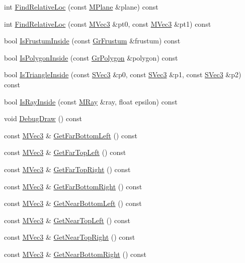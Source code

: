 \begin{CompactItemize}
\begin{CompactItemize}
int \hyperlink{class_gr_frustum_fa16710ead0525507d2f259836fd1c2c}{FindRelativeLoc} (const \hyperlink{class_m_plane}{MPlane} \&plane) const 
\item 
int \hyperlink{class_gr_frustum_c1d108b681015b4c01a7327302a86b6e}{FindRelativeLoc} (const \hyperlink{class_m_vec3}{MVec3} \&pt0, const \hyperlink{class_m_vec3}{MVec3} \&pt1) const 
\item 
bool \hyperlink{class_gr_frustum_40a44d1754e21de45629e9eb5b733cbc}{IsFrustumInside} (const \hyperlink{class_gr_frustum}{GrFrustum} \&frustum) const 
\item 
bool \hyperlink{class_gr_frustum_b48fd10eabe661c8d28e6ea55f143da5}{IsPolygonInside} (const \hyperlink{class_gr_polygon}{GrPolygon} \&polygon) const 
\item 
bool \hyperlink{class_gr_frustum_7bb6796010fb5e76de8f47850e0621da}{IsTriangleInside} (const \hyperlink{struct_s_vec3}{SVec3} \&p0, const \hyperlink{struct_s_vec3}{SVec3} \&p1, const \hyperlink{struct_s_vec3}{SVec3} \&p2) const 
\item 
bool \hyperlink{class_gr_frustum_1b77aec57f30ea71c3f583f2724166b8}{IsRayInside} (const \hyperlink{class_m_ray}{MRay} \&ray, float epsilon) const 
\item 
void \hyperlink{class_gr_frustum_daebcc27d64029d4749d2f3f08b373ac}{DebugDraw} () const 
\item 
const \hyperlink{class_m_vec3}{MVec3} \& \hyperlink{class_gr_frustum_397c8f3652cf399e6fd086fcf4e679fd}{GetFarBottomLeft} () const 
\item 
const \hyperlink{class_m_vec3}{MVec3} \& \hyperlink{class_gr_frustum_5cf3f35a1eddcde0f8f5386ed40c641f}{GetFarTopLeft} () const 
\item 
const \hyperlink{class_m_vec3}{MVec3} \& \hyperlink{class_gr_frustum_6501233fcb7db5d06b3ec22befa4fbdb}{GetFarTopRight} () const 
\item 
const \hyperlink{class_m_vec3}{MVec3} \& \hyperlink{class_gr_frustum_5aab839f4efc785026daf9c7c53284a0}{GetFarBottomRight} () const 
\item 
const \hyperlink{class_m_vec3}{MVec3} \& \hyperlink{class_gr_frustum_6c22fff9cd8287371cdf66a087d04ce9}{GetNearBottomLeft} () const 
\item 
const \hyperlink{class_m_vec3}{MVec3} \& \hyperlink{class_gr_frustum_5fc3092ebbcba98ef8d5e0c727d529e4}{GetNearTopLeft} () const 
\item 
const \hyperlink{class_m_vec3}{MVec3} \& \hyperlink{class_gr_frustum_199f18b22800f33724f6df2c69e489a9}{GetNearTopRight} () const 
\item 
const \hyperlink{class_m_vec3}{MVec3} \& \hyperlink{class_gr_frustum_7cfe947d96c2d3fe483ef2b45535e246}{GetNearBottomRight} () const 
\end{CompactItemize}



\end{CompactItemize}
